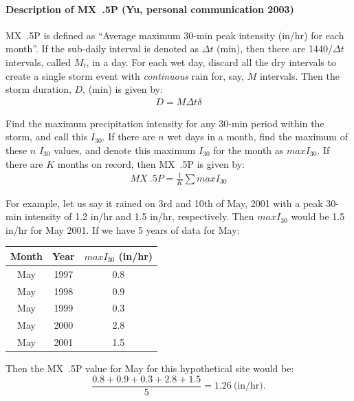 \paragraph{Description of MX~.5P (Yu, personal communication 2003)}
\label{sec:MX5PByBYu}

MX~.5P is defined as ``Average maximum 30-min peak intensity (in/hr) for each
month''. If the sub-daily interval is denoted as $\Delta t$ (min), then there
are 1440/$\Delta t$ intervals, called $M_t$, in a day. For each wet day, discard
all the dry intervals to create a single storm event with \emph{continuous} rain
for, say, $M$ intervals. Then the storm duration, $D$, (min) is given by:
\begin{eqnarray}
  D = M \Delta t \delta
\end{eqnarray}

Find the maximum precipitation intensity for any 30-min period within the storm,
and call this $I_{30}$. If there are $n$ wet days in a month, find the maximum
of these $n$ $I_{30}$ values, and denote this maximum $I_{30}$ for the month as
$maxI_{30}$. If there are $K$ months on record, then MX~.5P is given by:
\begin{eqnarray}
  MX~.5P = \frac{1}{K} \sum maxI_{30}
\end{eqnarray}

For example, let us say it rained on 3rd and 10th of May, 2001 with a peak
30-min intensity of 1.2 in/hr and 1.5 in/hr, respectively. Then $maxI_{30}$
would be 1.5 in/hr for May 2001. If we have 5 years of data for May:

\begin{table}[hbpt]
  \centering
  \begin{tabular}{ccc}
    \toprule
    Month & Year & $maxI_{30}$ (in/hr)\\
    \midrule
    May & 1997 & 0.8\\
    May & 1998 & 0.9\\
    May & 1999 & 0.3\\
    May & 2000 & 2.8\\
    May & 2001 & 1.5\\
    \bottomrule
  \end{tabular}
\end{table}

Then the MX~.5P value for May for this hypothetical site would be:
\begin{equation}
  \frac{0.8+0.9+0.3+2.8+1.5}{5} = 1.26 \ \textrm{(in/hr)}.
\end{equation}

